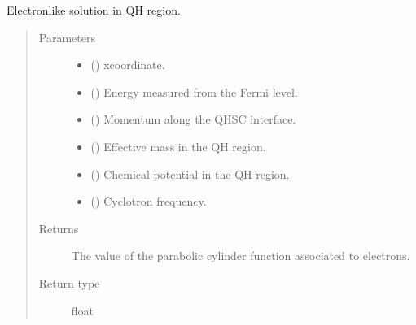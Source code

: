 \documentclass[letterpaper,10pt,english]{sphinxmanual}
\begin{document}

\begin{fulllineitems}
\label{\detokenize{modules:modules.functions.U_p}}
\pysigstartsignatures
{}
\pysigstopsignatures
\sphinxAtStartPar
Electron\sphinxhyphen{}like solution in QH region.
\begin{quote}\begin{description}
\item[{Parameters}] \leavevmode\begin{itemize}
\item {} 
\sphinxAtStartPar
{} () \textendash{} x\sphinxhyphen{}coordinate.

\item {} 
\sphinxAtStartPar
{} () \textendash{} Energy measured from the Fermi level.

\item {} 
\sphinxAtStartPar
{} () \textendash{} Momentum along the QH\sphinxhyphen{}SC interface.

\item {} 
\sphinxAtStartPar
{} () \textendash{} Effective mass in the QH region.

\item {} 
\sphinxAtStartPar
{} () \textendash{} Chemical potential in the QH region.

\item {} 
\sphinxAtStartPar
{} () \textendash{} Cyclotron frequency.

\end{itemize}

\item[{Returns}] \leavevmode
\sphinxAtStartPar
The value of the parabolic cylinder function associated to electrons.

\item[{Return type}] \leavevmode
\sphinxAtStartPar
float

\end{description}\end{quote}

\end{fulllineitems}
\end{document}
